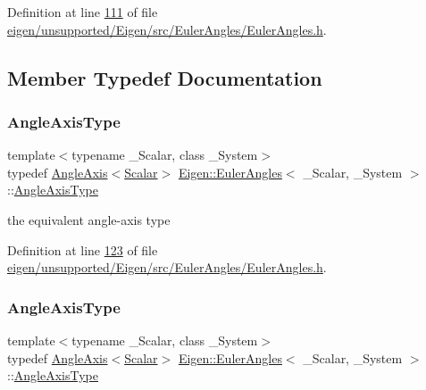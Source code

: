 Definition at line \hyperlink{eigen_2unsupported_2_eigen_2src_2_euler_angles_2_euler_angles_8h_source_l00111}{111} of file \hyperlink{eigen_2unsupported_2_eigen_2src_2_euler_angles_2_euler_angles_8h_source}{eigen/unsupported/\+Eigen/src/\+Euler\+Angles/\+Euler\+Angles.\+h}.



\subsection{Member Typedef Documentation}
\mbox{\label{class_eigen_1_1_euler_angles_a0bc2416b52b29a213eccad8a43ce61a6}} 
\subsubsection{\texorpdfstring{Angle\+Axis\+Type}{AngleAxisType}\hspace{0.1cm}{\footnotesize\ttfamily [1/2]}}
{\footnotesize\ttfamily template$<$typename \+\_\+\+Scalar, class \+\_\+\+System$>$ \\
typedef \hyperlink{group___geometry___module_class_eigen_1_1_angle_axis}{Angle\+Axis}$<$\hyperlink{class_eigen_1_1_euler_angles_a2ab1d433ac9683268446f8905ac31aac}{Scalar}$>$ \hyperlink{class_eigen_1_1_euler_angles}{Eigen\+::\+Euler\+Angles}$<$ \+\_\+\+Scalar, \+\_\+\+System $>$\+::\hyperlink{class_eigen_1_1_euler_angles_a0bc2416b52b29a213eccad8a43ce61a6}{Angle\+Axis\+Type}}

the equivalent angle-\/axis type 

Definition at line \hyperlink{eigen_2unsupported_2_eigen_2src_2_euler_angles_2_euler_angles_8h_source_l00123}{123} of file \hyperlink{eigen_2unsupported_2_eigen_2src_2_euler_angles_2_euler_angles_8h_source}{eigen/unsupported/\+Eigen/src/\+Euler\+Angles/\+Euler\+Angles.\+h}.

\mbox{\label{class_eigen_1_1_euler_angles_a0bc2416b52b29a213eccad8a43ce61a6}} 
\subsubsection{\texorpdfstring{Angle\+Axis\+Type}{AngleAxisType}\hspace{0.1cm}{\footnotesize\ttfamily [2/2]}}
{\footnotesize\ttfamily template$<$typename \+\_\+\+Scalar, class \+\_\+\+System$>$ \\
typedef \hyperlink{group___geometry___module_class_eigen_1_1_angle_axis}{Angle\+Axis}$<$\hyperlink{class_eigen_1_1_euler_angles_a2ab1d433ac9683268446f8905ac31aac}{Scalar}$>$ \hyperlink{class_eigen_1_1_euler_angles}{Eigen\+::\+Euler\+Angles}$<$ \+\_\+\+Scalar, \+\_\+\+System $>$\+::\hyperlink{class_eigen_1_1_euler_angles_a0bc2416b52b29a213eccad8a43ce61a6}{Angle\+Axis\+Type}}

